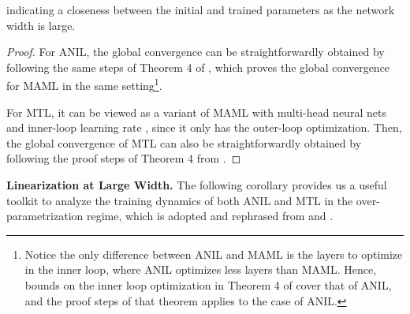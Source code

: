 \documentclass{article}
\begin{document}
indicating a closeness between the initial and trained parameters as the network width  is large.
\begin{proof}
For ANIL, the global convergence can be straightforwardly obtained by following the same steps of Theorem 4 of \citet{meta-ntk}, which proves the global convergence for MAML in the same setting\footnote{Notice the only difference between ANIL and MAML is the layers to optimize in the inner loop, where ANIL optimizes less layers than MAML. Hence, bounds on the inner loop optimization in Theorem 4 of \citet{meta-ntk} cover that of ANIL, and the proof steps of that theorem applies to the case of ANIL.}. 

For MTL, it can be viewed as a variant of MAML with multi-head neural nets and inner-loop learning rate , since it only has the outer-loop optimization. Then, the global convergence of MTL can also be straightforwardly obtained by following the proof steps of Theorem 4 from \citet{meta-ntk}.
\end{proof}


\textbf{Linearization at Large Width.} The following corollary provides us a useful toolkit to analyze the training dynamics of both ANIL and MTL in the over-parametrization regime, which is adopted and rephrased from \citet{meta-ntk} and \citet{lee2019wide}.
\end{document}
